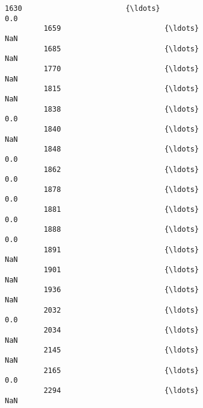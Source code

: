 \documentclass[11pt]{article}
\begin{document}
\begin{Verbatim}[commandchars=\\\{\}]
         1630                        {\ldots}                                         0.0   
         1659                        {\ldots}                                         NaN   
         1685                        {\ldots}                                         NaN   
         1770                        {\ldots}                                         NaN   
         1815                        {\ldots}                                         NaN   
         1838                        {\ldots}                                         0.0   
         1840                        {\ldots}                                         NaN   
         1848                        {\ldots}                                         0.0   
         1862                        {\ldots}                                         0.0   
         1878                        {\ldots}                                         0.0   
         1881                        {\ldots}                                         0.0   
         1888                        {\ldots}                                         0.0   
         1891                        {\ldots}                                         NaN   
         1901                        {\ldots}                                         NaN   
         1936                        {\ldots}                                         NaN   
         2032                        {\ldots}                                         0.0   
         2034                        {\ldots}                                         NaN   
         2145                        {\ldots}                                         NaN   
         2165                        {\ldots}                                         0.0   
         2294                        {\ldots}                                         NaN   
         

\end{Verbatim}
\end{document}
